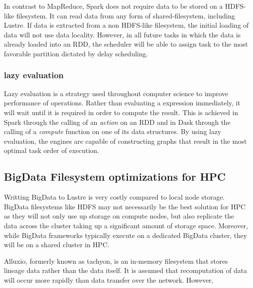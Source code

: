 \documentclass{report}
\begin{document}
                    In contrast to MapReduce, Spark does not require data to 
                    be stored on a HDFS-like filesystem. It can read data from
                    any form of shared-filesystem, including Lustre. If data 
                    is extracted from a non HDFS-like filesystem, the initial 
                    loading of data will not use data locality. However, in all
                    future tasks in which the data is already loaded into an 
                    RDD, the scheduler will be able to assign task to the most
                    favorable partition dictated by delay scheduling.

                    
                \subsubsection{lazy evaluation}

                    Lazy evaluation is a strategy used throughout computer 
                    science to improve performance of operations. Rather than
                    evaluating a expression immediately, it will wait until it 
                    is required in order to compute the result. This is 
                    achieved in Spark through the calling of an \textit{action}
                    on an RDD and in Dask through the calling of a 
                    \textit{compute} function on one of its data structures.
                    By using lazy evaluation, the engines are capable of 
                    constructing graphs that result in the most optimal
                    task order of execution.

            \subsection{BigData Filesystem optimizations for HPC}

                Writting BigData to Lustre is very costly compared to local 
                node storage. BigData filesystems like HDFS may not necessarily
                be the best solution for HPC as they will not only use up 
                storage on compute nodes, but also replicate the data across 
                the cluster taking up a significant amount of storage space.
                Moreover, while BigData frameworks typically execute on a 
                dedicated BigData cluster, they will be on a shared cluster in
                HPC.

                Alluxio, formerly known as tachyon, is an in-memory filesystem
                that stores lineage data rather than the data itself. It is
                assumed that recomputation of data will occur more rapidly than
                data transfer over the network. However, 
\end{document}
